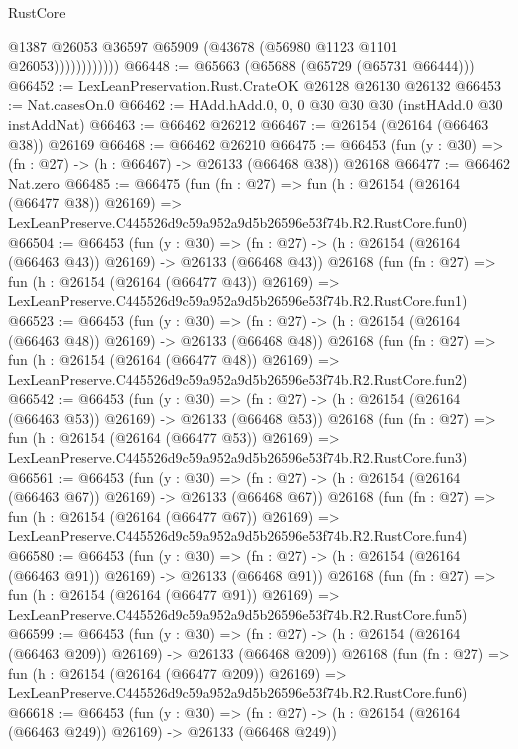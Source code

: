 \begin{lexlean}{RustCore}
\begin{coremodule}
                        @1387
                        @26053
                        @36597
                        @65909
                        (@43678 (@56980 @1123 @1101 @26053))))))))))))
@66448 := @65663 (@65688 (@65729 (@65731 @66444)))
@66452 := LexLeanPreservation.Rust.CrateOK @26128 @26130 @26132
@66453 := Nat.casesOn.{0}
@66462 := HAdd.hAdd.{0, 0, 0} @30 @30 @30 (instHAdd.{0} @30 instAddNat)
@66463 := @66462 @26212
@66467 := @26154 (@26164 (@66463 @38)) @26169
@66468 := @66462 @26210
@66475 := @66453 (fun (y : @30) => (fn : @27) -> (h : @66467) -> @26133 (@66468 @38)) @26168
@66477 := @66462 Nat.zero
@66485 := @66475
    (fun (fn : @27) =>
    fun (h : @26154 (@26164 (@66477 @38)) @26169) =>
    LexLeanPreserve.C445526d9c59a952a9d5b26596e53f74b.R2.RustCore.fun0)
@66504 := @66453
    (fun (y : @30) =>
    (fn : @27) -> (h : @26154 (@26164 (@66463 @43)) @26169) -> @26133 (@66468 @43))
    @26168
    (fun (fn : @27) =>
    fun (h : @26154 (@26164 (@66477 @43)) @26169) =>
    LexLeanPreserve.C445526d9c59a952a9d5b26596e53f74b.R2.RustCore.fun1)
@66523 := @66453
    (fun (y : @30) =>
    (fn : @27) -> (h : @26154 (@26164 (@66463 @48)) @26169) -> @26133 (@66468 @48))
    @26168
    (fun (fn : @27) =>
    fun (h : @26154 (@26164 (@66477 @48)) @26169) =>
    LexLeanPreserve.C445526d9c59a952a9d5b26596e53f74b.R2.RustCore.fun2)
@66542 := @66453
    (fun (y : @30) =>
    (fn : @27) -> (h : @26154 (@26164 (@66463 @53)) @26169) -> @26133 (@66468 @53))
    @26168
    (fun (fn : @27) =>
    fun (h : @26154 (@26164 (@66477 @53)) @26169) =>
    LexLeanPreserve.C445526d9c59a952a9d5b26596e53f74b.R2.RustCore.fun3)
@66561 := @66453
    (fun (y : @30) =>
    (fn : @27) -> (h : @26154 (@26164 (@66463 @67)) @26169) -> @26133 (@66468 @67))
    @26168
    (fun (fn : @27) =>
    fun (h : @26154 (@26164 (@66477 @67)) @26169) =>
    LexLeanPreserve.C445526d9c59a952a9d5b26596e53f74b.R2.RustCore.fun4)
@66580 := @66453
    (fun (y : @30) =>
    (fn : @27) -> (h : @26154 (@26164 (@66463 @91)) @26169) -> @26133 (@66468 @91))
    @26168
    (fun (fn : @27) =>
    fun (h : @26154 (@26164 (@66477 @91)) @26169) =>
    LexLeanPreserve.C445526d9c59a952a9d5b26596e53f74b.R2.RustCore.fun5)
@66599 := @66453
    (fun (y : @30) =>
    (fn : @27) -> (h : @26154 (@26164 (@66463 @209)) @26169) -> @26133 (@66468 @209))
    @26168
    (fun (fn : @27) =>
    fun (h : @26154 (@26164 (@66477 @209)) @26169) =>
    LexLeanPreserve.C445526d9c59a952a9d5b26596e53f74b.R2.RustCore.fun6)
@66618 := @66453
    (fun (y : @30) =>
    (fn : @27) -> (h : @26154 (@26164 (@66463 @249)) @26169) -> @26133 (@66468 @249))

\end{coremodule}
\end{lexlean}
